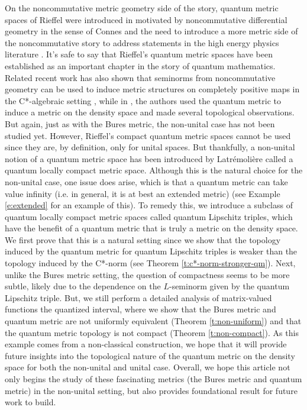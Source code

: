 \documentclass{amsart}
\theoremstyle{plain}
\theoremstyle{definition}
\theoremstyle{remark}
\numberwithin{equation}{section}
\begin{document}
On the noncommutative metric geometry side of the story, quantum metric spaces of Rieffel were  introduced in \cite{Rieffel98a} motivated by noncommutative differential geometry in the sense of Connes \cite{Connes} and the need to introduce a more metric side of the noncommutative story to address statements in the high energy physics literature \cite{Rieffel00}. It's safe to say that  Rieffel's quantum metric spaces have been established as an important chapter in the story of quantum mathematics. Related recent work has also shown that seminorms from noncommutative geometry can be used to induce metric structures on completely positive maps in the C*-algebraic setting \cite{abelo25}, while in \cite{Aguilar25}, the authors used the quantum metric to induce a metric on the density space and made several topological observations. But again, just as with the Bures metric, the non-unital case has not been studied yet. However, Rieffel's compact quantum metric spaces cannot be used since they are, by definition, only for unital spaces. But thankfully, a non-unital notion of a quantum metric space has been introduced by Latr\'emoli\`ere \cite{Latremoliere12b} called a quantum locally compact metric space. Although this is the natural choice for the non-unital case, one issue does arise, which is that  a quantum metric can take value infinity (i.e. in general, it is at best an extended metric) (see Example \ref{e:extended} for an example of this). To remedy this, we introduce a subclass of quantum locally compact metric spaces called quantum Lipschitz triples, which have the benefit of a quantum metric that is truly a metric on the density space. We first prove that this is a natural setting since we show that the topology induced by the quantum metric for quantum Lipschitz triples is weaker than the topology induced by the C*-norm (see Theorem \ref{t:c*-norm-stronger-qm}). Next, unlike the Bures metric setting, the question of compactness seems to be more subtle, likely due to the dependence on the $L$-seminorm given by the quantum Lipschitz triple. But, we still perform a detailed analysis of matrix-valued functions the quantized interval, where we show that the Bures metric and quantum metric are not uniformly equivalent (Theorem \ref{t:non-uniform}) and that the quantum metric topology is not compact (Theorem \ref{t:non-compact}). As this example comes from a non-classical construction, we hope that it will provide future insights into the topological nature of the quantum metric on the density space for both the non-unital and  unital case. Overall, we hope this article not only begins the study of these fascinating metrics (the Bures metric and quantum metric) in the non-unital setting, but also provides foundational result for future work to build.
\end{document}

